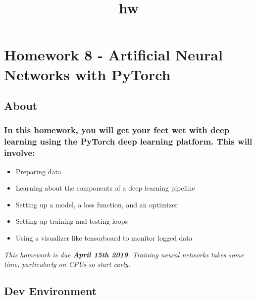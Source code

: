 \documentclass[11pt]{article}
\title{hw}
\providecommand{\tightlist}{%
      \setlength{\itemsep}{0pt}\setlength{\parskip}{0pt}}
\begin{document}
    
    
    \maketitle
    
    

    
    \hypertarget{homework-8---artificial-neural-networks-with-pytorch}{%
\section{Homework 8 - Artificial Neural Networks with
PyTorch}\label{homework-8---artificial-neural-networks-with-pytorch}}

    \hypertarget{about}{%
\subsection{About}\label{about}}

    \hypertarget{in-this-homework-you-will-get-your-feet-wet-with-deep-learning-using-the-pytorch-deep-learning-platform.-this-will-involve}{%
\subsubsection{In this homework, you will get your feet wet with deep
learning using the PyTorch deep learning platform. This will
involve:}\label{in-this-homework-you-will-get-your-feet-wet-with-deep-learning-using-the-pytorch-deep-learning-platform.-this-will-involve}}

\begin{itemize}
\tightlist
\item
  Preparing data
\item
  Learning about the components of a deep learning pipeline
\item
  Setting up a model, a loss function, and an optimizer
\item
  Setting up training and testing loops
\item
  Using a visualizer like tensorboard to monitor logged data
\end{itemize}

\emph{This homework is due \textbf{April 15th 2019}. Training neural
networks takes some time, particularly on CPUs so start early.}

    \hypertarget{dev-environment}{%
\subsection{Dev Environment}\label{dev-environment}}
\end{document}
